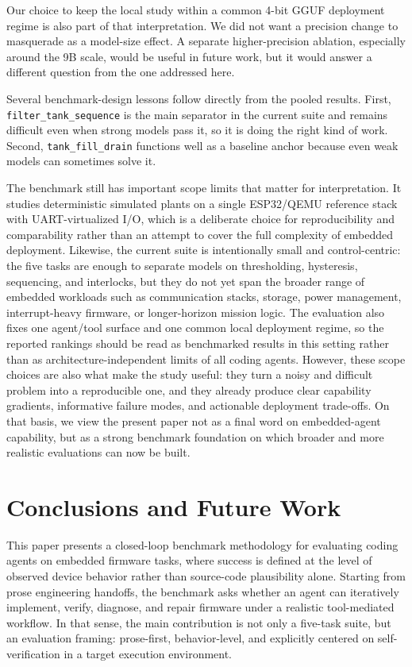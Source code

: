 \documentclass[a4paper,fleqn]{cas-dc}
\DeclareRobustCommand{\tool}[1]{\texttt{\nolinkurl{#1}}}
\begin{document}
Our choice to keep the local study within a common 4-bit GGUF deployment regime is also part of that interpretation. We did not want a precision change to masquerade as a model-size effect. A separate higher-precision ablation, especially around the 9B scale, would be useful in future work, but it would answer a different question from the one addressed here.

Several benchmark-design lessons follow directly from the pooled results. First, \tool{filter_tank_sequence} is the main separator in the current suite and remains difficult even when strong models pass it, so it is doing the right kind of work. Second, \tool{tank_fill_drain} functions well as a baseline anchor because even weak models can sometimes solve it.

The benchmark still has important scope limits that matter for interpretation. It studies deterministic simulated plants on a single ESP32/QEMU reference stack with UART-virtualized I/O, which is a deliberate choice for reproducibility and comparability rather than an attempt to cover the full complexity of embedded deployment. Likewise, the current suite is intentionally small and control-centric: the five tasks are enough to separate models on thresholding, hysteresis, sequencing, and interlocks, but they do not yet span the broader range of embedded workloads such as communication stacks, storage, power management, interrupt-heavy firmware, or longer-horizon mission logic. The evaluation also fixes one agent/tool surface and one common local deployment regime, so the reported rankings should be read as benchmarked results in this setting rather than as architecture-independent limits of all coding agents. However, these scope choices are also what make the study useful: they turn a noisy and difficult problem into a reproducible one, and they already produce clear capability gradients, informative failure modes, and actionable deployment trade-offs. On that basis, we view the present paper not as a final word on embedded-agent capability, but as a strong benchmark foundation on which broader and more realistic evaluations can now be built.

\section{Conclusions and Future Work}
\label{sec:conclusion}

This paper presents a closed-loop benchmark methodology for evaluating coding agents on embedded firmware tasks, where success is defined at the level of observed device behavior rather than source-code plausibility alone. Starting from prose engineering handoffs, the benchmark asks whether an agent can iteratively implement, verify, diagnose, and repair firmware under a realistic tool-mediated workflow. In that sense, the main contribution is not only a five-task suite, but an evaluation framing: prose-first, behavior-level, and explicitly centered on self-verification in a target execution environment.
\end{document}
